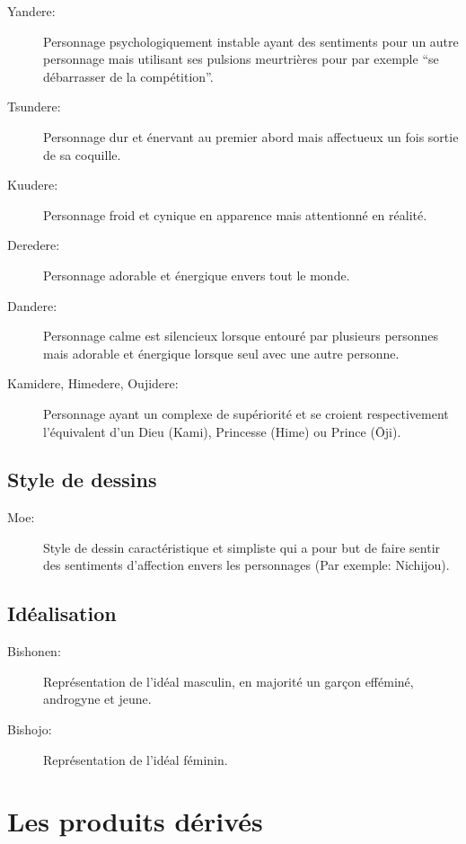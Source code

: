 \begin{description}
	\item[Yandere:] Personnage psychologiquement instable ayant des
		sentiments pour un autre personnage mais utilisant ses pulsions
		meurtrières pour par exemple ``se débarrasser de la compétition''.
	\item[Tsundere:] Personnage dur et énervant au premier abord mais
		affectueux un fois sortie de sa coquille.
	\item[Kuudere:] Personnage froid et cynique en apparence mais attentionné
		en réalité.
	\item[Deredere:] Personnage adorable et énergique envers tout le monde.
	\item[Dandere:] Personnage calme est silencieux lorsque entouré par
		plusieurs personnes mais adorable et énergique lorsque seul avec une
		autre personne.
	\item[Kamidere, Himedere, Oujidere:] Personnage ayant un complexe
		de supériorité et se croient respectivement l'équivalent d'un
		Dieu (Kami), Princesse (Hime) ou Prince (\=Oji).
\end{description}

\section{Style de dessins}

\begin{description}
	\item[Moe:] Style de dessin caractéristique et simpliste qui a pour but de
		faire sentir des sentiments d'affection envers les personnages (Par
		exemple: Nichijou).
\end{description}

\section{Idéalisation}

\begin{description}
	\item[Bishonen:] Représentation de l'idéal masculin, en majorité un garçon
		efféminé, androgyne et jeune.
	\item[Bishojo:] Représentation de l'idéal féminin.
\end{description}

\chapter{Les produits dérivés}

